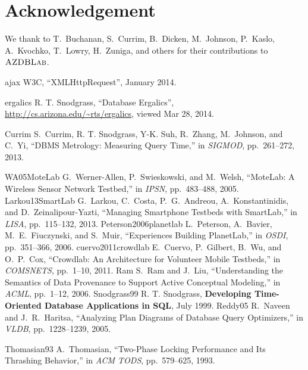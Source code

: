 \documentclass{vldb}
\def\azdb{\hbox{\sc AZDBLab}}
\begin{document}
\vspace{-1.2ex}

\section{Acknowledgement}
We thank to T.~Buchanan, S.~Currim, B.~Dicken, \linebreak M.~\hbox{Johnson}, P.~Kaslo, A.~Kvochko, T.~Lowry, 
H.~Zuniga, and others for their contributions to $\azdb$.

\vspace{-0.9ex}


\newcommand{\etalchar}[1]{$^{#1}$}
\begin{thebibliography}{99}
\vspace{0.1em}
\bibitem
{ajax}
W3C, ``XMLHttpRequest'', January 2014.

\bibitem
{ergalics}
R. T. Snodgrass, “Database Ergalics”, \url{http://cs.}\linebreak\url{arizona.edu/~rts/ergalics}, viewed Mar 28, 2014.

\bibitem
{Currim}
S.~Currim, R. T. Snodgrass, Y-K. Suh, R.~Zhang, M.~Johnson, and C.~Yi, ``DBMS Metrology: Measuring Query Time,'' in {\em SIGMOD}, 
pp.~261--272, 2013.


\bibitem
{WA05MoteLab}
G.~Werner-Allen, P.~Swieskowski, and M.~Welsh, ``MoteLab: A Wireless Sensor Network Testbed,'' in {\em IPSN}, pp.~483--488, 2005.
%
%
\bibitem
{Larkou13SmartLab}
G.~Larkou, C.~Costa, P.~G.~Andreou, A.~Konstantinidis, and D.~Zeinalipour-Yazti, ``Managing Smartphone Testbeds with SmartLab,'' in {\em LISA}, pp.~115--132, 2013.
%
\bibitem
{Peterson2006planetlab}
L.~Peterson, A.~Bavier, M.~E.~Fiuczynski, and S.~Muir, ``Experiences Building PlanetLab,'' in {\em OSDI}, pp.~351--366, 2006.
%
\bibitem
{cuervo2011crowdlab}
E.~Cuervo, P.~Gilbert, B.~Wu, and O.~P.~Cox, ``\hbox{Crowdlab:} An Architecture for Volunteer Mobile Testbeds,'' in {\em COMSNETS}, pp.~1--10, 2011.
%
\bibitem
{Ram}
S.~Ram and J.~Liu, ``Understanding the Semantics of Data Provenance to Support Active Conceptual Modeling,'' in {\em ACML}, pp.~1--12, 2006.
%
\bibitem 
{Snodgrass99}
R. T. Snodgrass, {\bf Developing Time-Oriented Database Applications in SQL},  July 1999.
%
\bibitem
{Reddy05}
R.~Naveen and J.~R.~Haritsa, ``Analyzing Plan Diagrams of Database Query Optimizers,'' in {\em VLDB}, 
pp.~1228--1239, 2005.

\bibitem
{Thomasian93}
A.~Thomasian, ``Two-Phase Locking Performance and Its Thrashing Behavior,'' in {\em ACM TODS}, 
pp.~579--625, 1993.

\end{thebibliography}
\end{document}
